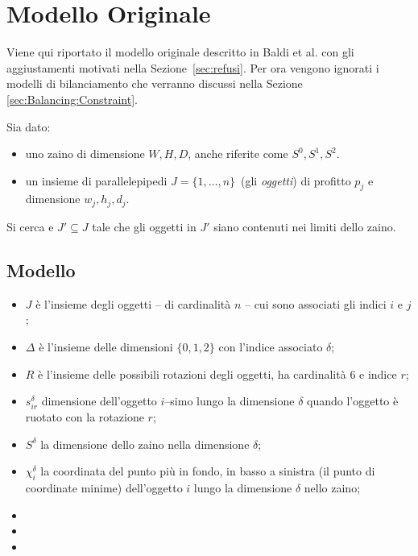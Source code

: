 \section{Modello Originale}
\label{sec:modello:originale}

Viene qui riportato il modello originale descritto in Baldi et al. 
\cite{Baldi20129802}
con gli aggiustamenti motivati nella Sezione~\ref{sec:refusi}.
Per ora vengono ignorati i modelli di bilanciamento che verranno discussi
nella Sezione \ref{sec:Balancing:Constraint}.




Sia dato:
\begin{itemize} 
	\item uno zaino di dimensione $W, H, D$, anche riferite come $S^0, S^1, S^2$.
	\item un insieme di parallelepipedi $J = \{1, \dots, n\}$\ (gli \emph{oggetti})
	di profitto $p_j$ e dimensione $w_j, h_j, d_j$.
\end{itemize}

Si cerca e $J' \subseteq J$ tale che gli oggetti in $J'$ siano contenuti nei 
limiti dello zaino.


\subsection{Modello}
\begin{itemize}
	\item $J$ è l'insieme degli oggetti -- di cardinalità $n$ -- cui sono 
	associati gli indici $i$ e $j$;
	\item $\Delta$ è l'insieme delle dimensioni $\{0,1,2\}$ con l'indice associato
	$\delta$;
	\item $R$ è l'insieme delle possibili rotazioni degli oggetti, ha 
	cardinalità $6$ e indice $r$;
	\item $s_{ir}^\delta$ dimensione dell'oggetto $i$--simo lungo la dimensione
	$\delta$ quando l'oggetto è ruotato con la rotazione $r$;
	\item $S^\delta$ la dimensione dello zaino nella dimensione $\delta$;
	\item $\chi_{i}^\delta$ la coordinata del punto più in fondo, in basso a 
	sinistra (il punto di coordinate minime) dell'oggetto $i$ lungo la 
	dimensione $\delta$ nello zaino;
	\item 
	\item 
	\item {}
\end{itemize}


